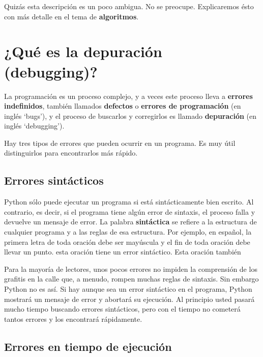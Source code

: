 Quizás esta descripción es un poco ambigua. No se preocupe.
Explicaremos ésto con más detalle en el tema de {\bf algoritmos}.

\section{¿Qué es la depuración (debugging)?}

La programación es un proceso complejo, y a veces este proceso
lleva a {\bf errores indefinidos}, también llamados {\bf defectos}
o {\bf errores de programación} (en inglés `bugs'), y el proceso de
buscarlos y corregirlos es llamado {\bf depuración} (en inglés
`debugging').

Hay tres tipos de errores que pueden ocurrir en un programa. Es
muy útil distinguirlos para encontrarlos más rápido.

\subsection{Errores sintácticos}

Python sólo puede ejecutar un programa si está sintácticamente
bien escrito. Al contrario, es decir, si el programa
tiene algún error de sintaxis, el proceso falla y devuelve un
mensaje de error. La palabra {\bf sintáctica} se refiere a la
estructura de cualquier programa y a las reglas de esa estructura.
 Por ejemplo, en español, la primera letra de
toda oración debe ser mayúscula y el fin de toda oración debe llevar un punto. 
esta oración tiene un error sintáctico. Esta oración también

Para la mayoría de lectores, unos pocos errores no impiden la
comprensión de los grafitis en la calle que, a menudo, rompen muchas
reglas de sintaxis. Sin embargo Python no es así. Si hay aunque
sea un error sintáctico en el programa, Python mostrará un mensaje
de error y abortará su ejecución. Al principio usted
pasará mucho tiempo buscando errores sintácticos, pero con el
tiempo no cometerá tantos errores y los encontrará rápidamente.

\subsection{Errores en tiempo de ejecución}
\label{runtime}

